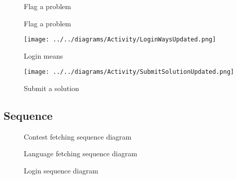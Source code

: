 \begin{figure}[H]
    \centering
    \caption{Flag a problem}
\end{figure}
\pagebreak

\begin{figure}[H]
    \centering
    \caption{Flag a problem}
\end{figure}
\pagebreak

\begin{figure}[H]
    \centering
    \texttt{[image: ../../diagrams/Activity/LoginWaysUpdated.png]}
    \caption{Login means}
\end{figure}
\pagebreak

\begin{figure}[H]
    \centering
    \texttt{[image: ../../diagrams/Activity/SubmitSolutionUpdated.png]}
    \caption{Submit a solution}
\end{figure}
\pagebreak


\vspace*{\fill}
\subsection*{Sequence}
\vspace*{\fill}
\pagebreak

\begin{figure}[H]
    \centering
    \caption{Contest fetching sequence diagram}
\end{figure}
\pagebreak

\begin{figure}[H]
    \centering
    \caption{Language fetching sequence diagram}
\end{figure}
\pagebreak

\begin{figure}[H]
    \centering
    \caption{Login sequence diagram}
\end{figure}
\pagebreak

